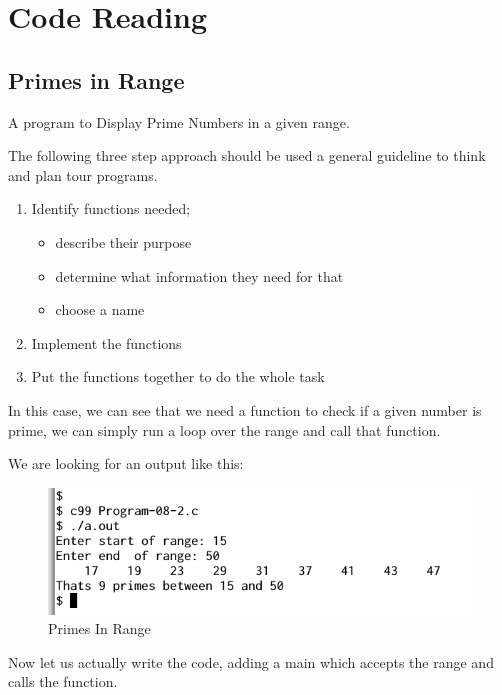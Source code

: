 \documentclass[11pt,a4paper]{article}
\begin{document}
\section*{Code Reading}
\subsection*{Primes in Range}
A program to Display Prime Numbers in a given range.

The following three step approach should be used a general guideline to think and plan tour programs.

\begin{enumerate}
  \item Identify functions needed; 
    \begin{itemize}
    \item describe their purpose 
    \item determine what information they need for that
    \item choose a name
    \end{itemize}
  \item Implement the functions 
  \item Put the functions together to do the whole task
\end{enumerate}

In this case, we can see that we need a function to check if a given number is prime, we can simply run a loop over the range and call that function.

We are looking for an output like this:
\begin{figure}[ht]
\begin{center}
\includegraphics[scale=0.6]{Output-08-2.png}
\caption{Primes In Range}
\label{output-08-2}
\end{center}
\end{figure}

Now let us actually write the code, adding a main which accepts the range and calls the function.


\end{document}
